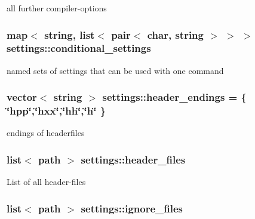 all further compiler-\/options \hypertarget{structsettings_ac27735f1d33fb886c326a795d4368994}{
\subsubsection[{conditional\-\_\-settings}]{\setlength{\rightskip}{0pt plus 5cm}map$<$ string, list$<$ pair$<$ char, string $>$ $>$ $>$ settings\-::conditional\-\_\-settings\hspace{0.3cm}{\ttfamily [static]}}}\label{structsettings_ac27735f1d33fb886c326a795d4368994}
named sets of settings that can be used with one command \hypertarget{structsettings_a041d015d89dc53beca67ff8171e4eebb}{
\subsubsection[{header\-\_\-endings}]{\setlength{\rightskip}{0pt plus 5cm}vector$<$ string $>$ settings\-::header\-\_\-endings = \{ \char`\"{}hpp\char`\"{},\char`\"{}hxx\char`\"{},\char`\"{}hh\char`\"{},\char`\"{}h\char`\"{} \}\hspace{0.3cm}{\ttfamily [static]}}}\label{structsettings_a041d015d89dc53beca67ff8171e4eebb}
endings of headerfiles \hypertarget{structsettings_ab910724468ff0119dcb5fec1399eac9f}{
\subsubsection[{header\-\_\-files}]{\setlength{\rightskip}{0pt plus 5cm}list$<$ path $>$ settings\-::header\-\_\-files\hspace{0.3cm}{\ttfamily [static]}}}\label{structsettings_ab910724468ff0119dcb5fec1399eac9f}
List of all header-\/files \hypertarget{structsettings_aff7f8f80b30749135c089741a4e07b0c}{
\subsubsection[{ignore\-\_\-files}]{\setlength{\rightskip}{0pt plus 5cm}list$<$ path $>$ settings\-::ignore\-\_\-files\hspace{0.3cm}{\ttfamily [static]}}}\label{structsettings_aff7f8f80b30749135c089741a4e07b0c}
